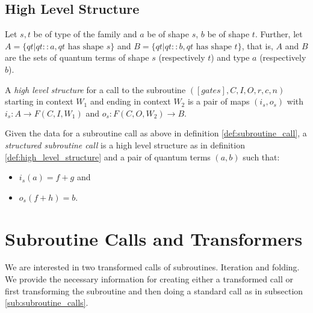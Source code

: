 
\subsection{High Level Structure} %
\label{sub:high_level_structure}

Let $s,t$ be of type of the family 
and $a$ be of shape $s$, $b$ be of shape $t$.
Further, let $A = \{qt|qt::a, qt \text{ has shape }s\}$
and $B = \{qt|qt::b, qt \text{ has shape }t\}$, that is,
$A$ and $B$ are the sets of quantum terms of shape $s$
(respectively $t$) and type $a$ (respectively $b$).

\begin{definition}\label{def:high_level_structure}
  A \emph{high level structure} for a call to the subroutine
  $([gates],C,I,O,r,c,n)$ starting in context $W_1$ and
  ending in context $W_2$ is a
  pair of maps $(i_s,o_s)$ with $i_s:A \to F(C,I,W_1)$
  and $o_s:F(C,O,W_2)\to B$.
\end{definition}

\begin{definition}\label{def:structured_subroutine_call}
  Given the data for a subroutine call as above in definition
  \ref{def:subroutine_call}, a \emph{structured subroutine call} is a
  high level structure as in definition \ref{def:high_level_structure}
  and a pair of quantum terms $(a,b)$ such that:
  \begin{itemize}
    \item $i_s(a) = f+g$ and
    \item $o_s(f+h) = b$.
  \end{itemize}

\end{definition}



\section{Subroutine Calls and Transformers} %
\label{sec:subroutine_calls_and_transformers}

We are interested in two transformed calls of subroutines. Iteration and
folding. We provide the necessary information for creating either a
transformed call or first transforming the subroutine and then doing a
standard call as in subsection \ref{sub:subroutine_calls}.


